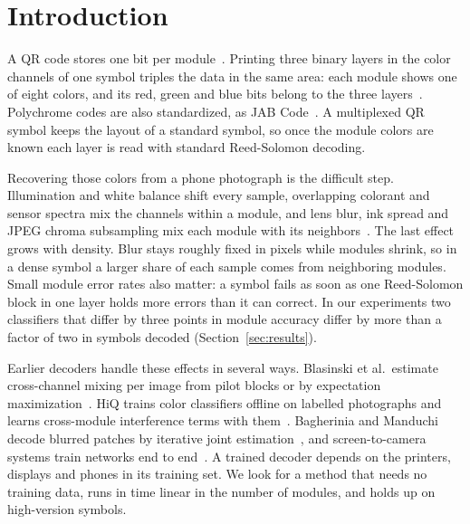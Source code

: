 \section{Introduction}
\label{sec:intro}

A QR code stores one bit per module~\cite{iso18004}. Printing three binary layers in the
color channels of one symbol triples the data in the same area: each module shows one of
eight colors, and its red, green and blue bits belong to the three
layers~\cite{andre2014colour,blasinski2013pccc,yang2018hiq}. Polychrome codes are also
standardized, as JAB Code~\cite{iso23634}. A multiplexed QR symbol keeps the layout of a
standard symbol, so once the module colors are known each layer is read with standard
Reed-Solomon decoding.

Recovering those colors from a phone photograph is the difficult step. Illumination and
white balance shift every sample, overlapping colorant and sensor spectra mix the channels
within a module, and lens blur, ink spread and JPEG chroma subsampling mix each module with
its neighbors~\cite{yang2018hiq}. The last effect grows with density. Blur stays roughly
fixed in pixels while modules shrink, so in a dense symbol a larger share of each sample
comes from neighboring modules. Small module error rates also matter: a symbol fails as soon
as one Reed-Solomon block in one layer holds more errors than it can correct. In our
experiments two classifiers that differ by three points in module accuracy differ by more
than a factor of two in symbols decoded (Section~\ref{sec:results}).

Earlier decoders handle these effects in several ways. Blasinski et al.\ estimate
cross-channel mixing per image from pilot blocks or by expectation
maximization~\cite{blasinski2013pccc,bulan2012em}. HiQ trains color classifiers offline on
labelled photographs and learns cross-module interference terms with
them~\cite{yang2018hiq}. Bagherinia and Manduchi decode blurred patches by iterative joint
estimation~\cite{bagherinia2014blur}, and screen-to-camera systems train networks end to
end~\cite{tamang2021deepd2c,tran2021deeplight}. A trained decoder depends on the printers,
displays and phones in its training set. We look for a method that needs no training data,
runs in time linear in the number of modules, and holds up on high-version symbols.

